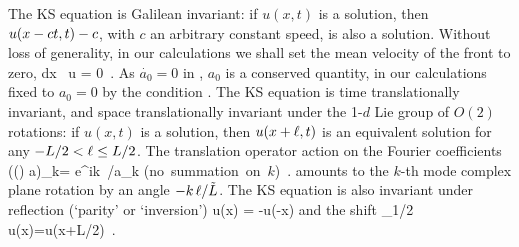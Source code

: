 The  KS equation is Galilean invariant: if $u(x,t)$ is a solution,
then $u(x -ct,t) -c $, with $c$ an arbitrary constant
speed, is also a solution. Without loss of generality, in our
calculations we shall set the mean velocity of the front to zero,
\beq \int dx \, u = 0 \,. 
As $\dot{a_0}=0$ in
, $a_0$ is a conserved quantity, in our calculations
fixed to $a_0=0$ by the
condition . The KS equation   is time
translationally invariant, and space translationally invariant under
the 1-$d$ Lie group of $O(2)$ rotations: if $u(x,t)$ is a solution,
then $u(x+\shift,t)$ is an equivalent solution for any $-L/2 <
\shift \leq L/2$.
The translation operator action on the Fourier coefficients
\beq
  ((\shift) a)_k= e^{ik\, \shift /\tildeL}a_k
    \qquad \mbox{(no summation on $k$)}
    \,.
    \label{eq:RPOcondFouri}
\eeq amounts to the $k$-th mode complex plane rotation by an angle
$-k\, \ell /\tilde{L}$. The KS equation is also invariant under
reflection (`parity' or `inversion')
\beq \Refl u(x) = -u(-x)
and the shift
\beq \Shift_{1/2} u(x)=u(x+L/2) \,.
%


